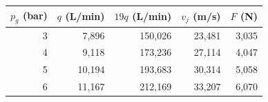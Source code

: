 \begin{tabular}{@{}rrrrr@{}}
\toprule
$p_g$ (bar) & $q$ (L/min) & $19q$ (L/min) & $v_j$ (m/s) & $F$ (N)\\\midrule
3 & 7{,}896 & 150{,}026 & 23{,}481 & 3{,}035\\
4 & 9{,}118 & 173{,}236 & 27{,}114 & 4{,}047\\
5 & 10{,}194 & 193{,}683 & 30{,}314 & 5{,}058\\
6 & 11{,}167 & 212{,}169 & 33{,}207 & 6{,}070\\
\bottomrule
\end{tabular}